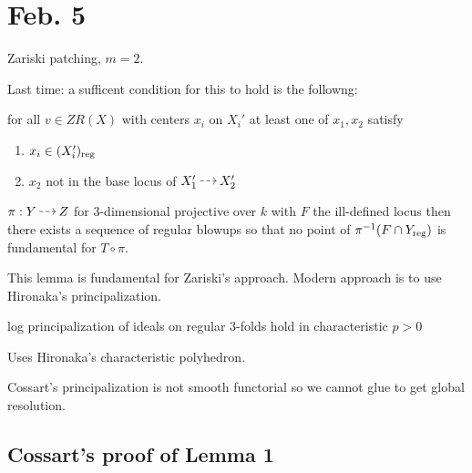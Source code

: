 \documentclass[12pt]{article}
\begin{document}
\section{Feb. 5}

Zariski patching, $m = 2$.

Last time: a sufficent condition for this to hold is the followng:
\begin{center}
for all $v \in ZR(X)$ with centers $x_i$ on $X_i'$ at least one of $x_1, x_2$ satisfy
\begin{enumerate}
\item $x_i \in (X_i')_{\mathrm{reg}}$
\item $x_2$ not in the base locus of $X_1' \rat X_2'$
\end{enumerate}
\end{center}

\begin{lemma}
$\pi : Y \rat Z$ for $3$-dimensional projective over $k$ with $F$ the ill-defined locus then there exists a sequence of regular blowups so that no point of $\pi^{-1}(F \cap Y_{\mathrm{reg}})$ is fundamental for $T \circ \pi$. 
\end{lemma}

This lemma is fundamental for Zariski's approach. Modern approach is to use Hironaka's principalization. 

\begin{theorem}
log principalization of ideals on regular $3$-folds hold in characteristic $p > 0$
\end{theorem}

Uses Hironaka's characteristic polyhedron. 

\begin{rmk}
Cossart's principalization is not smooth functorial so we cannot glue to get global resolution.
\end{rmk}

\subsection{Cossart's proof of Lemma 1}
\end{document}
